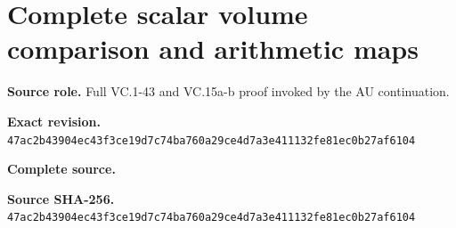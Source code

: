\begingroup
\sloppy
\small
\let\split\aligned
\let\endsplit\endaligned
\clearpage
\section{Complete scalar volume comparison and arithmetic maps}
\noindent\textbf{Source role.} Full VC.1-43 and VC.15a-b proof invoked by the AU continuation.\par
\noindent\textbf{Exact revision.} \nolinkurl{47ac2b43904ec43f3ce19d7c74ba760a29ce4d7a3e411132fe81ec0b27af6104}\par
\noindent\textbf{Complete source.} \par
\noindent\textbf{Source SHA-256.} \nolinkurl{47ac2b43904ec43f3ce19d7c74ba760a29ce4d7a3e411132fe81ec0b27af6104}\par\medskip

\endgroup
